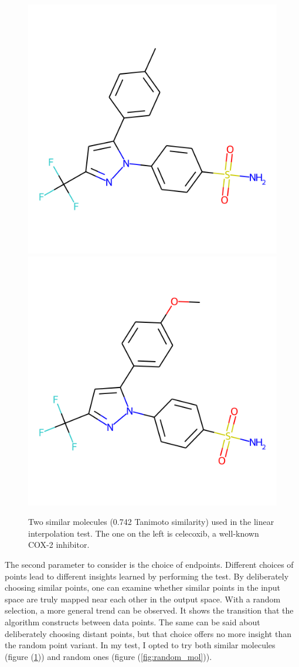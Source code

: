 \begin{figure}[!h]
	\centering
	\includegraphics[width=0.4\columnwidth]{figures/coxib1}
	\includegraphics[width=0.4\columnwidth]{figures/coxib2}
	\caption{Two similar molecules (0.742 Tanimoto similarity) used in the linear interpolation test. The one on the left is celecoxib, a well-known COX-2 inhibitor. }
	\label{fig:coxib}
\end{figure}

The second parameter to consider is the choice of endpoints. Different choices of points lead to different insights learned by performing the test. By deliberately choosing similar points, one can examine whether similar points in the input space are truly mapped near each other in the output space. With a random selection, a more general trend can be observed. It shows the transition that the algorithm constructs between data points. The same can be said about deliberately choosing distant points, but that choice offers no more insight than the random point variant. In my test, I opted to try both similar molecules (figure (\ref{fig:coxib})) and random ones (figure (\ref{fig:random_mol})).

